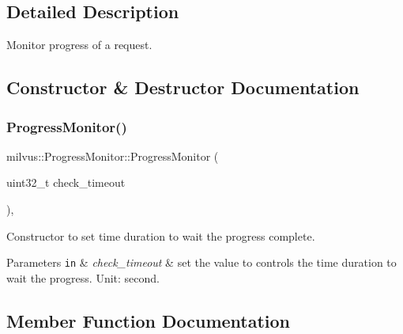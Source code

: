 \subsection{Detailed Description}
Monitor progress of a request. 

\subsection{Constructor \& Destructor Documentation}
\mbox{\label{classmilvus_1_1_progress_monitor_aa702e92c695d3824bae1919d636c5fc9}} 
\subsubsection{\texorpdfstring{Progress\+Monitor()}{ProgressMonitor()}}
{\footnotesize\ttfamily milvus\+::\+Progress\+Monitor\+::\+Progress\+Monitor (\begin{DoxyParamCaption}\item[{uint32\+\_\+t}]{check\+\_\+timeout }\end{DoxyParamCaption})\hspace{0.3cm}{\ttfamily [inline]}, {\ttfamily [explicit]}}



Constructor to set time duration to wait the progress complete. 


\begin{DoxyParams}[1]{Parameters}
\mbox{\tt in}  & {\em check\+\_\+timeout} & set the value to controls the time duration to wait the progress. Unit\+: second. \\
\hline
\end{DoxyParams}


\subsection{Member Function Documentation}
\mbox{\label{classmilvus_1_1_progress_monitor_a529c4122413fa59fbb46cf85f7e56d3f}} 

